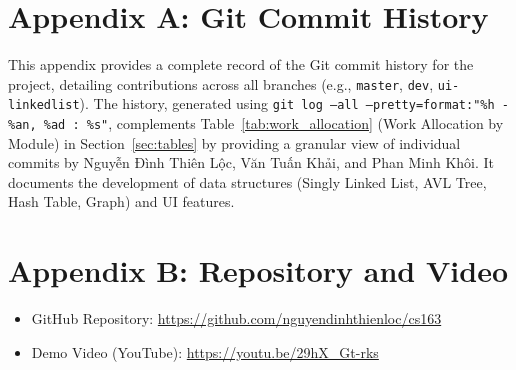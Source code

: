 \section*{Appendix A: Git Commit History}
\begin{flushleft}
\label{app:commit_history}
This appendix provides a complete record of the Git commit history for the project, detailing contributions across all branches (e.g., \texttt{master}, \texttt{dev}, \texttt{ui-linkedlist}). The history, generated using \texttt{git log --all --pretty=format:"\%h - \%an, \%ad : \%s"}, complements Table~\ref{tab:work_allocation} (Work Allocation by Module) in Section~\ref{sec:tables} by providing a granular view of individual commits by Nguyễn Đình Thiên Lộc, Văn Tuấn Khải, and Phan Minh Khôi. It documents the development of data structures (Singly Linked List, AVL Tree, Hash Table, Graph) and UI features.
\end{flushleft}


\section*{Appendix B: Repository and Video}
\begin{itemize}
    \item GitHub Repository: \url{https://github.com/nguyendinhthienloc/cs163}
    \item Demo Video (YouTube): \url{https://youtu.be/29hX_Gt-rks}
\end{itemize}